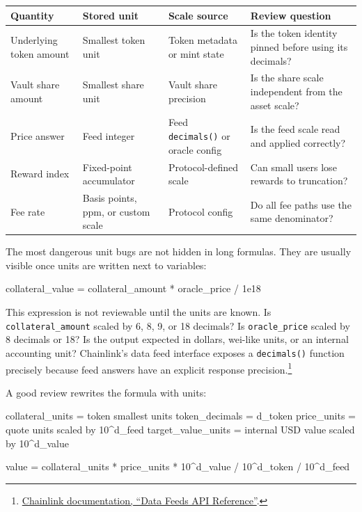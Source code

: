 \begin{table}[htbp]
\centering
\small
\renewcommand{\arraystretch}{1.16}
\begin{tabularx}{\textwidth}{@{}>{\RaggedRight\arraybackslash}p{}>{\RaggedRight\arraybackslash}p{}>{\RaggedRight\arraybackslash}p{}X@{}}
\toprule
Quantity & Stored unit & Scale source & Review question \\
\midrule
Underlying token amount & Smallest token unit & Token metadata or mint state & Is the token identity pinned before using its decimals? \\
Vault share amount & Smallest share unit & Vault share precision & Is the share scale independent from the asset scale? \\
Price answer & Feed integer & Feed \texttt{decimals()} or oracle config & Is the feed scale read and applied correctly? \\
Reward index & Fixed-point accumulator & Protocol-defined scale & Can small users lose rewards to truncation? \\
Fee rate & Basis points, ppm, or custom scale & Protocol config & Do all fee paths use the same denominator? \\
\bottomrule
\end{tabularx}
\end{table}

The most dangerous unit bugs are not hidden in long formulas. They are usually visible once units are written next to variables:

\begin{codeblock}
collateral_value = collateral_amount * oracle_price / 1e18
\end{codeblock}

This expression is not reviewable until the units are known. Is \texttt{collateral\_amount} scaled by 6, 8, 9, or 18 decimals? Is \texttt{oracle\_price} scaled by 8 decimals or 18? Is the output expected in dollars, wei-like units, or an internal accounting unit? Chainlink's data feed interface exposes a \texttt{decimals()} function precisely because feed answers have an explicit response precision.\footnote{\href{https://docs.chain.link/data-feeds/api-reference}{Chainlink documentation, ``Data Feeds API Reference''}.}

A good review rewrites the formula with units:

\begin{codeblock}
collateral_units     = token smallest units
token_decimals       = d_token
price_units          = quote units scaled by 10^d_feed
target_value_units   = internal USD value scaled by 10^d_value

value =
    collateral_units
    * price_units
    * 10^d_value
    / 10^d_token
    / 10^d_feed
\end{codeblock}

